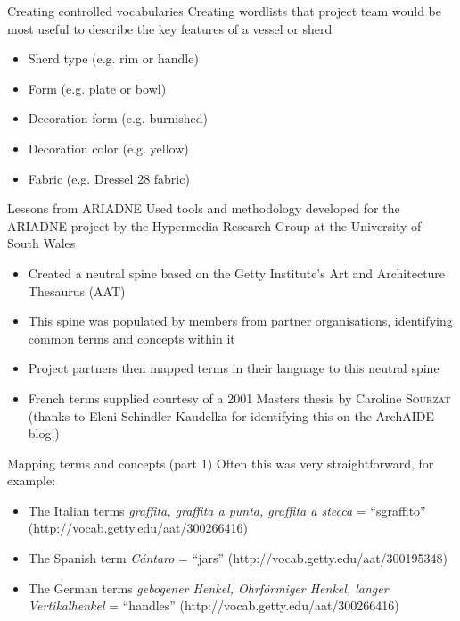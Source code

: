 \documentclass[xcolor=x11names, aspectratio=169,usenames,dvipsnames]{beamer}
\begin{document}
\begin{frame}{Creating controlled vocabularies}
Creating wordlists that project team would be most useful to describe the key features of a vessel or sherd
\begin{itemize}
\item Sherd type (e.g. rim or handle)
\item Form (e.g. plate or bowl)
\item Decoration form (e.g. burnished)
\item Decoration color (e.g. yellow)
\item Fabric (e.g. Dressel 28 fabric)
\end{itemize}
\end{frame}

\begin{frame}{Lessons from ARIADNE}
\hfill{}\newline
Used tools and methodology developed for the ARIADNE project by the Hypermedia Research Group at the University of South Wales \newline
\begin{itemize}
\item Created a neutral spine based on the Getty Institute's Art and Architecture Thesaurus (AAT)
\item This spine was populated by members from partner organisations, identifying common terms and concepts within it
\item Project partners then mapped terms in their language to this neutral spine
\item French terms supplied courtesy of a 2001 Masters thesis by Caroline \textsc{Sourzat} (thanks to Eleni Schindler Kaudelka for identifying this on the ArchAIDE blog!)
\end{itemize}
\end{frame}

\begin{frame}{Mapping terms and concepts (part 1)}
Often this was very straightforward, for example:
\begin{itemize}
\item The Italian terms \emph{graffita, graffita a punta, graffita a stecca} = \enquote{sgraffito} (http://vocab.getty.edu/aat/300266416)
\item The Spanish term \emph{Cántaro} = \enquote{jars} (http://vocab.getty.edu/aat/300195348)
\item The German terms \emph{gebogener Henkel, Ohrförmiger Henkel, langer Vertikalhenkel} = \enquote{handles} (http://vocab.getty.edu/aat/300266416)
\end{itemize}
\end{frame}
\end{document}
